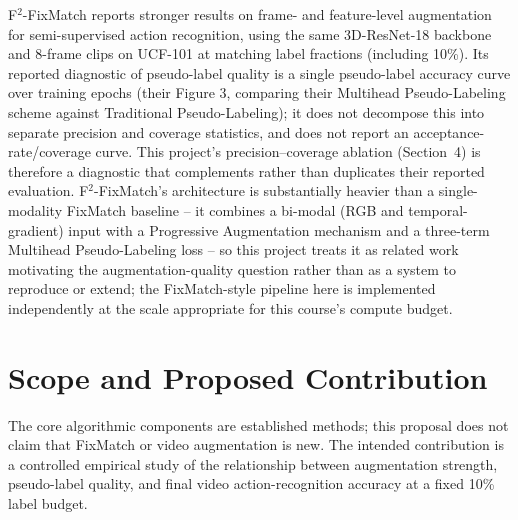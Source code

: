 \documentclass[11pt,a4paper]{article}
\begin{document}
F$^2$-FixMatch \cite{f2fixmatch} reports stronger results on frame- and feature-level augmentation for semi-supervised action recognition, using the same 3D-ResNet-18 backbone and 8-frame clips on UCF-101 at matching label fractions (including 10\%). Its reported diagnostic of pseudo-label quality is a single pseudo-label accuracy curve over training epochs (their Figure 3, comparing their Multihead Pseudo-Labeling scheme against Traditional Pseudo-Labeling); it does not decompose this into separate precision and coverage statistics, and does not report an acceptance-rate/coverage curve. This project's precision--coverage ablation (Section~4) is therefore a diagnostic that complements rather than duplicates their reported evaluation. F$^2$-FixMatch's architecture is substantially heavier than a single-modality FixMatch baseline -- it combines a bi-modal (RGB and temporal-gradient) input with a Progressive Augmentation mechanism and a three-term Multihead Pseudo-Labeling loss -- so this project treats it as related work motivating the augmentation-quality question rather than as a system to reproduce or extend; the FixMatch-style pipeline here is implemented independently at the scale appropriate for this course's compute budget.

\section{Scope and Proposed Contribution}
The core algorithmic components are established methods; this proposal does not claim that FixMatch or video augmentation is new. The intended contribution is a controlled empirical study of the relationship between augmentation strength, pseudo-label quality, and final video action-recognition accuracy at a fixed 10\% label budget.
\end{document}
